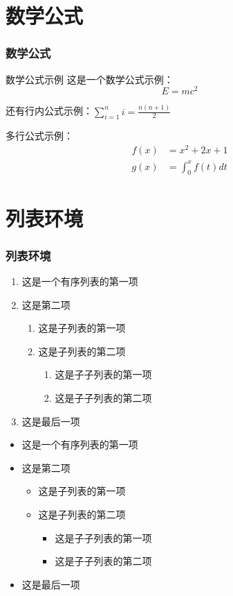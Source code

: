 \documentclass[10pt]{beamer}
\begin{document}
\section{数学公式}
\begin{frame}
\frametitle{数学公式}

\begin{block}{数学公式示例}
这是一个数学公式示例：
\[ E = mc^2 \]

还有行内公式示例：$\sum_{i=1}^{n} i = \frac{n(n+1)}{2}$

多行公式示例：
\begin{align}
  f(x) &= x^2 + 2x + 1 \\
  g(x) &= \int_0^x f(t) dt
\end{align}

\end{block}

\end{frame}

\section{列表环境}
\begin{frame}
\frametitle{列表环境}
\begin{enumerate}
  \item 这是一个有序列表的第一项
  \item 这是第二项
  \begin{enumerate}
    \item 这是子列表的第一项
    \item 这是子列表的第二项
    \begin{enumerate}
      \item 这是子子列表的第一项
      \item 这是子子列表的第二项
    \end{enumerate}
  \end{enumerate}
  \item 这是最后一项
\end{enumerate}

\begin{itemize}
  \item 这是一个有序列表的第一项
  \item 这是第二项
  \begin{itemize}
    \item 这是子列表的第一项
    \item 这是子列表的第二项
    \begin{itemize}
      \item 这是子子列表的第一项
      \item 这是子子列表的第二项
    \end{itemize}
  \end{itemize}
  \item 这是最后一项
\end{itemize}

\end{frame}
\end{document}
